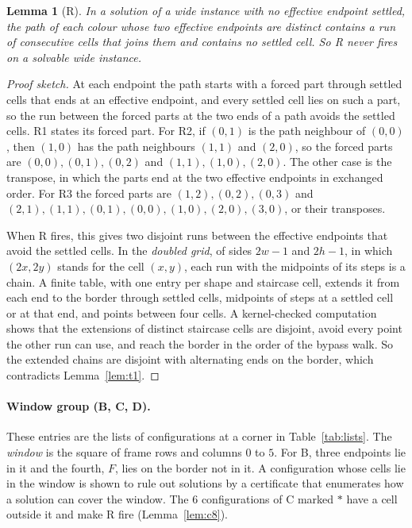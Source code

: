 \documentclass[11pt]{article}
\newtheorem{lemma}[theorem]{Lemma}
\newcommand{\ent}[1]{\textsf{#1}}
\begin{document}
\begin{lemma}[\ent{R}]\label{lem:forced}\label{lem:r}
In a solution of a wide instance with no effective endpoint settled, the path of each colour
whose two effective endpoints are distinct contains a run of consecutive cells that joins them
and contains no settled cell. So \ent{R} never fires on a solvable wide instance.
\end{lemma}
\begin{proof}[Proof sketch]
At each endpoint the path starts with a forced part through settled cells that ends at an
effective endpoint, and every settled cell lies on such a part, so the run between the forced
parts at the two ends of a path avoids the settled cells. \ent{R1} states its forced part. For
\ent{R2}, if $(0,1)$ is the path neighbour of $(0,0)$, then $(1,0)$ has the path
neighbours $(1,1)$ and $(2,0)$, so the forced parts are $(0,0),(0,1),(0,2)$ and $(1,1),(1,0),(2,0)$.
The other case is the transpose, in which the parts end at the two effective endpoints in
exchanged order. For \ent{R3} the forced parts are $(1,2),(0,2),(0,3)$ and
$(2,1),(1,1),(0,1),(0,0),(1,0),(2,0),(3,0)$, or their transposes.

When \ent{R} fires, this gives two disjoint runs between the effective endpoints that avoid the
settled cells. In the \emph{doubled grid}, of sides $2w-1$ and $2h-1$, in which $(2x,2y)$ stands
for the cell $(x,y)$, each run with the midpoints of its steps is a chain. A finite table, with
one entry per shape and staircase cell, extends it from each end to the border through settled
cells, midpoints of steps at a settled cell or at that end, and points between four cells. A kernel-checked computation
shows that the extensions of distinct staircase cells are disjoint, avoid every point the other
run can use, and reach the border in the order of the bypass walk. So the extended chains are
disjoint with alternating ends on the border, which contradicts Lemma~\ref{lem:t1}.
\end{proof}

\paragraph{Window group (\ent{B}, \ent{C}, \ent{D}).}
These entries are the lists of configurations at a corner in Table~\ref{tab:lists}. The
\emph{window} is the square of frame rows and columns $0$ to $5$. For \ent{B}, three endpoints lie
in it and the fourth, $F$, lies on the border not in it. A configuration whose cells lie in the
window is shown to rule out solutions by a certificate that enumerates how a solution can cover
the window. The $6$ configurations of \ent{C} marked $*$ have a cell outside it and make \ent{R}
fire (Lemma~\ref{lem:c8}).
\end{document}
